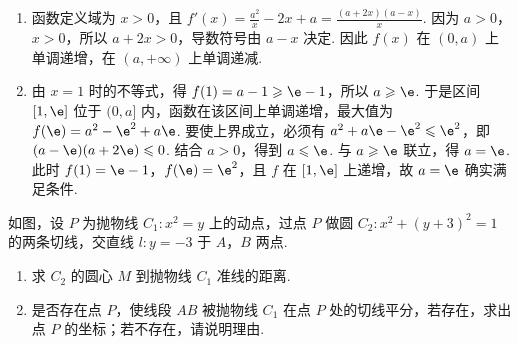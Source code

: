 \begin{solution}
\begin{enumerate}
\item 函数定义域为 \(x>0\)，且 \(f'(x)=\frac{a^2}{x}-2x+a=\frac{(a+2x)(a-x)}{x}\). 因为 \(a>0\)，\(x>0\)，所以 \(a+2x>0\)，导数符号由 \(a-x\) 决定. 因此 \(f(x)\) 在 \((0,a)\) 上单调递增，在 \((a,+\infty)\) 上单调递减.
\item 由 \(x=1\) 时的不等式，得 \(f(1)=a-1\geqslant\e-1\)，所以 \(a\geqslant\e\). 于是区间 \([1,\e]\) 位于 \((0,a]\) 内，函数在该区间上单调递增，最大值为 \(f(\e)=a^2-\e^2+a\e\). 要使上界成立，必须有 \(a^2+a\e-\e^2\leqslant\e^2\)，即 \((a-\e)(a+2\e)\leqslant0\). 结合 \(a>0\)，得到 \(a\leqslant\e\). 与 \(a\geqslant\e\) 联立，得 \(a=\e\). 此时 \(f(1)=\e-1\)，\(f(\e)=\e^2\)，且 \(f\) 在 \([1,\e]\) 上递增，故 \(a=\e\) 确实满足条件.
\end{enumerate}
\end{solution}

\begin{problem}
如图，设 \(P\) 为抛物线 \(C_1: x^2 = y\) 上的动点，过点 \(P\) 做圆 \(C_2: x^2 + (y + 3)^2 = 1\) 的两条切线，交直线 \(l: y = -3\) 于 \(A\)，\(B\) 两点.
\begin{enumerate}
\item 求 \(C_{2}\) 的圆心 \(M\) 到抛物线 \(C_{1}\) 准线的距离.
\item 是否存在点 \(P\)，使线段 \(AB\) 被抛物线 \(C_1\) 在点 \(P\) 处的切线平分，若存在，求出点 \(P\) 的坐标；若不存在，请说明理由.
\end{enumerate}
\end{problem}

